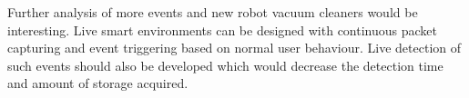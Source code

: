 Further analysis of more events and new robot vacuum cleaners would be interesting. Live smart environments can be designed with continuous packet capturing and event triggering based on normal user behaviour. Live detection of such events should also be developed which would decrease the detection time and amount of storage acquired. 






